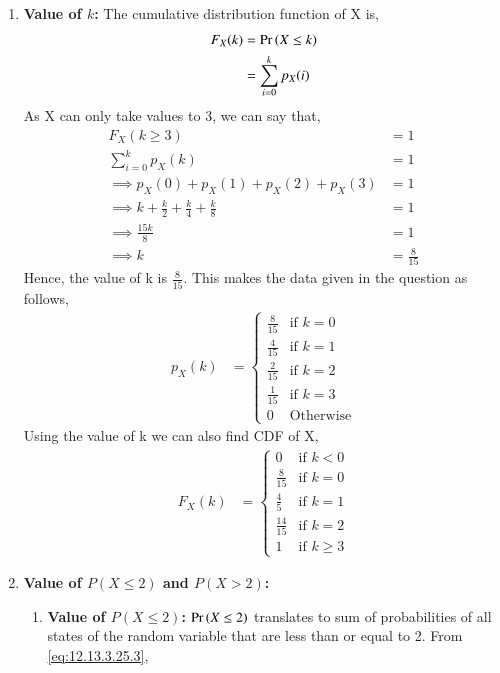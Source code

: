 \documentclass[journal,12pt,twocolumn]{IEEEtran}
\theoremstyle{remark}
\begin{document}
\begin{enumerate}
\item \textbf{Value of $k$:} The cumulative distribution function of X is,
\begin{align}
	F_{X}(k) &= \Pr\left(X \le k\right)\\
	&= \sum_{i=0}^{k}p_X(i) 
\end{align}
As X can only take values to 3, we can say that,
\begin{align}
	F_{X}(k \ge 3) &= 1\\
	\sum_{i=0}^{k}p_X(k) &= 1\\
	\implies p_X(0)+p_X(1)+p_X(2)+p_X(3) &= 1\\
	\implies k +\frac{k}{2} + \frac{k}{4} + \frac{k}{8} &= 1\\
	\implies \frac{15k}{8} &= 1\\
	\implies k &= \frac{8}{15}
\end{align}
Hence, the value of k is $\frac{8}{15}$.
This makes the data given in the question as follows,
\begin{align}
p_{X}(k) &= 
		\begin{cases}
			\frac{8}{15} & \text{if } k = 0 \\
			\frac{4}{15} & \text{if } k = 1 \\
			\frac{2}{15} & \text{if } k = 2 \\
			\frac{1}{15} & \text{if } k = 3 \\
			0 & \text{Otherwise}
		\end{cases}
\end{align} \label{eq:12.13.3.25.4}
Using the value of k we can also find CDF of X,
\begin{align}
F_{X}(k) &= 
		\begin{cases}
			0 & \text{if } k<0\\
			\frac{8}{15} & \text{if } k = 0 \\
			\frac{4}{5} & \text{if } k = 1 \\
			\frac{14}{15} & \text{if } k = 2 \\
			1 & \text{if } k \ge 3
		\end{cases} \label{eq:12.13.3.25.3}
\end{align}
\item \textbf{Value of $P(X \le 2)$ and $P(X > 2)$:}
	\begin{enumerate}
	\item \textbf{Value of $P(X \le 2)$:} $\Pr\left(X \le 2\right)$ translates to sum of probabilities of all states of the random variable that are less than or equal to 2. From \eqref{eq:12.13.3.25.3},

\end{enumerate}
\end{enumerate}
\end{document}
